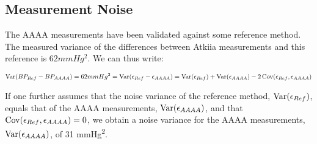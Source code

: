\subsection{Measurement Noise}

The AAAA measurements have been validated against some reference method. The
measured variance of the differences between Atkiia measurements and this reference
is $62 mmHg^2$. We can thus write:

\begin{align*}
    \operatorname{Var}(BP_{Ref} - BP_{AAAA}) = 62 mmHg^2 = \operatorname{Var}(\epsilon_{Ref} - \epsilon_{AAAA})
    = \operatorname{Var}(\epsilon_{Ref}) + \operatorname{Var}(\epsilon_{AAAA}) - 2\operatorname{Cov}(\epsilon_{Ref},
    \epsilon_{AAAA})
\end{align*}

If one further assumes that the noise variance of the reference method,
$\operatorname{Var}(\epsilon_{Ref})$, equals that of the AAAA measurements,
$\operatorname{Var}(\epsilon_{AAAA})$, and that $\operatorname{Cov}(\epsilon_{Ref}, \epsilon_{AAAA})=0$, we
obtain a noise variance for the AAAA measurements, $\operatorname{Var}(\epsilon_{AAAA})$, of 31
mmHg\textsuperscript{2}.

